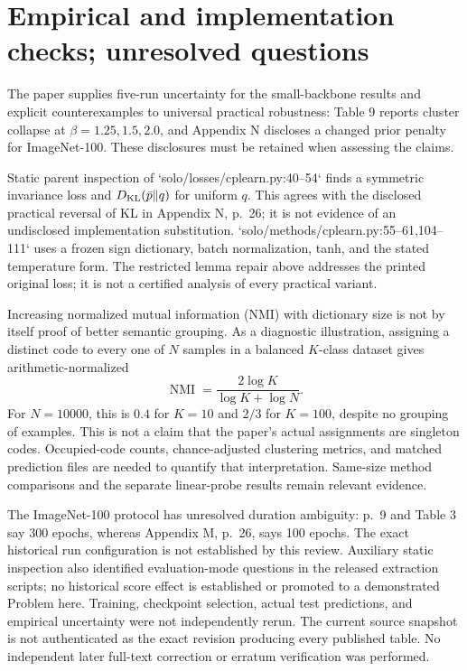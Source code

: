 \documentclass[10pt]{article}
\begin{document}
\section*{Empirical and implementation checks; unresolved questions}
The paper supplies five-run uncertainty for the small-backbone results and explicit counterexamples to universal practical robustness: Table 9 reports cluster collapse at \(\beta=1.25,1.5,2.0\), and Appendix N discloses a changed prior penalty for ImageNet-100. These disclosures must be retained when assessing the claims.\par
Static parent inspection of `solo/losses/cplearn.py:40--54` finds a symmetric invariance loss and \(D_{\rm KL}(\bar p\|q)\) for uniform \(q\). This agrees with the disclosed practical reversal of KL in Appendix N, p. 26; it is not evidence of an undisclosed implementation substitution. `solo/methods/cplearn.py:55--61,104--111` uses a frozen sign dictionary, batch normalization, tanh, and the stated temperature form. The restricted lemma repair above addresses the printed original loss; it is not a certified analysis of every practical variant.\par
Increasing normalized mutual information (NMI) with dictionary size is not by itself proof of better semantic grouping. As a diagnostic illustration, assigning a distinct code to every one of \(N\) samples in a balanced \(K\)-class dataset gives arithmetic-normalized \[\operatorname{NMI}=\frac{2\log K}{\log K+\log N}.\] For \(N=10000\), this is \(0.4\) for \(K=10\) and \(2/3\) for \(K=100\), despite no grouping of examples. This is not a claim that the paper’s actual assignments are singleton codes. Occupied-code counts, chance-adjusted clustering metrics, and matched prediction files are needed to quantify that interpretation. Same-size method comparisons and the separate linear-probe results remain relevant evidence.\par
The ImageNet-100 protocol has unresolved duration ambiguity: p. 9 and Table 3 say 300 epochs, whereas Appendix M, p. 26, says 100 epochs. The exact historical run configuration is not established by this review. Auxiliary static inspection also identified evaluation-mode questions in the released extraction scripts; no historical score effect is established or promoted to a demonstrated Problem here. Training, checkpoint selection, actual test predictions, and empirical uncertainty were not independently rerun. The current source snapshot is not authenticated as the exact revision producing every published table. No independent later full-text correction or erratum verification was performed.\par
\end{document}
